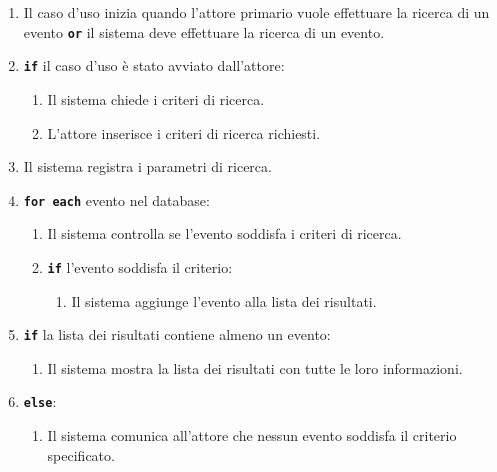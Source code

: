 \documentclass{article}
\begin{document}
		\begin{enumerate}[itemsep=8pt,parsep=0pt]

		\item Il caso d'uso inizia quando l'attore primario vuole effettuare la ricerca di un evento \texttt{\textbf{or}} il sistema deve effettuare la ricerca di un evento.

		\item \texttt{\textbf{if}} il caso d'uso è stato avviato dall'attore:
			\begin{enumerate}	[leftmargin=28pt]
				\item Il sistema chiede i criteri di ricerca.
				\item L'attore inserisce i criteri di ricerca richiesti.
  			\end{enumerate}	

		\item Il sistema registra i parametri di ricerca.

		\item \texttt{\textbf{for each}} evento nel database:
			\begin{enumerate}	[leftmargin=28pt]
				\item Il sistema controlla se l'evento soddisfa i criteri di ricerca.
				\item \texttt{\textbf{if}} l'evento soddisfa il criterio:
					\begin{enumerate}	[leftmargin=28pt]
						\item Il sistema aggiunge l'evento alla lista dei risultati.
		  			\end{enumerate}	
  			\end{enumerate}	

		\item \texttt{\textbf{if}} la lista dei risultati contiene almeno un evento:
			\begin{enumerate}	[leftmargin=28pt]
				\item Il sistema mostra la lista dei risultati con tutte le loro informazioni.
  			\end{enumerate}	

		\item \texttt{\textbf{else}}:
			\begin{enumerate}	[leftmargin=28pt]
				\item Il sistema comunica all'attore che nessun evento soddisfa il criterio specificato.
  			\end{enumerate}	
		
\end{enumerate}	
	
\end{document}

